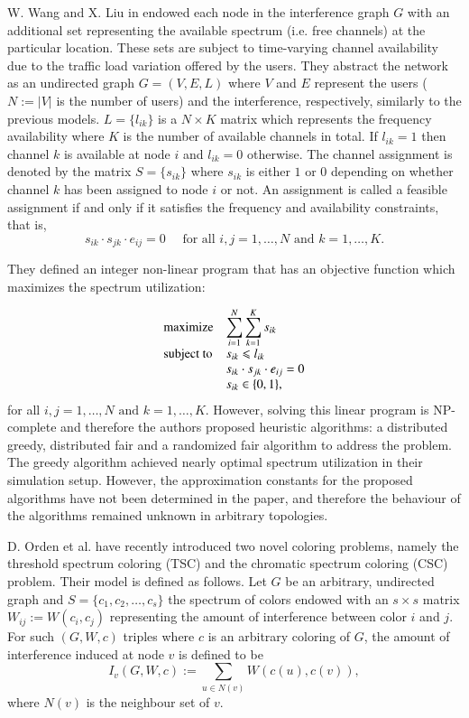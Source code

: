\documentclass[a4paper, 12pt]{article}
\begin{document}
W. Wang and X. Liu in \cite{wang-liu} endowed each node in the interference graph $G$ with an additional set representing the available spectrum (i.e. free channels) at the particular location. These sets are subject to time-varying channel availability due to the traffic load variation offered by the users. They abstract the network as an undirected graph $G=(V,E,L)$ where $V$ and $E$ represent the users ($N:=|V|$ is the number of users) and the interference, respectively, similarly to the previous models. $L = \lbrace l_{ik} \rbrace$ is a $N \times K$ matrix which represents the frequency availability where $K$ is the number of available channels in total. If $l_{ik} = 1$ then channel $k$ is available at node $i$ and $l_{ik} = 0$ otherwise. The channel assignment is denoted by the matrix $S = \lbrace s_{ik} \rbrace$ where $s_{ik}$ is either $1$ or $0$ depending on whether channel $k$ has been assigned to node $i$ or not. An assignment is called a feasible assignment if and only if it satisfies the frequency and availability constraints, that is,
$$s_{ik} \cdot s_{jk} \cdot e_{ij}=0 \quad \text{ for all } i,j=1,\ldots,N \text{ and } k = 1, \ldots, K.$$

They defined an integer non-linear program that has an objective function which maximizes the spectrum utilization:

\begin{equation}\label{eq:list-multicolor}
\begin{array}{ll@{}ll}
\text{maximize}  & \displaystyle\sum\limits_{i=1}^{N} \sum\limits_{k=1}^{K} s_{ik} &\\
\text{subject to}& s_{ik} \leqslant l_{ik}\\
                 & s_{ik} \cdot s_{jk} \cdot e_{ij}=0 \\
                 & s_{ik} \in \lbrace 0,1 \rbrace,
\end{array}
\end{equation}
for all $i,j=1,\ldots,N \text{ and } k = 1, \ldots, K.$
However, solving this linear program is NP-complete and therefore the authors proposed heuristic algorithms: a distributed greedy, distributed fair and a randomized fair algorithm to address the problem. The greedy algorithm achieved nearly optimal spectrum utilization in their simulation setup. However, the approximation constants for the proposed algorithms have not been determined in the paper, and therefore the behaviour of the algorithms remained unknown in arbitrary topologies. 

D. Orden et al. \cite{orden} have recently introduced two novel coloring problems, namely the threshold spectrum coloring (TSC) and the chromatic spectrum coloring (CSC) problem. Their model is defined as follows. Let $G$ be an arbitrary, undirected graph and $S = \lbrace c_1, c_2, \ldots, c_s \rbrace$ the spectrum of colors endowed with an $s \times s$ matrix $W_{ij} := W(c_i,c_j)$ representing the amount of interference between color $i$ and $j$. For such $(G,W,c)$ triples where $c$ is an arbitrary coloring of $G$, the amount of interference induced at node $v$ is defined to be
$$I_v(G,W,c) := \sum_{u \in N(v)}W(c(u),c(v)),$$
where $N(v)$ is the neighbour set of $v$.
\end{document}
